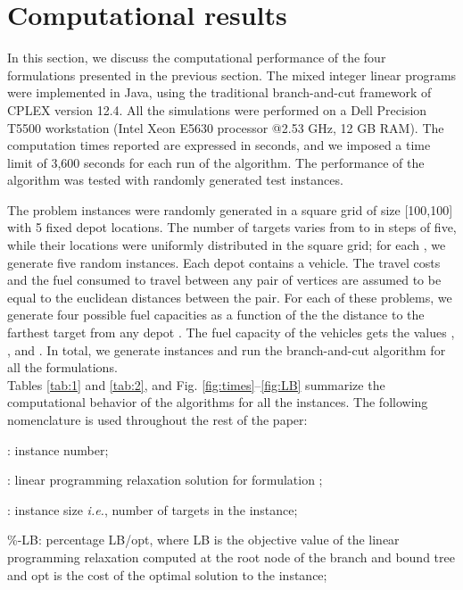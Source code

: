 \documentclass[letterpaper, 10pt, conference]{ieeeconf}
\begin{document}
\section{Computational results} \label{sec:results}
In this section, we discuss the computational performance of the four formulations presented in the previous section. The mixed integer linear programs were implemented in Java, using the traditional branch-and-cut framework of CPLEX version 12.4. All the simulations were performed on a Dell Precision T5500 workstation (Intel Xeon E5630 processor @2.53 GHz, 12 GB RAM). The computation times reported are expressed in seconds, and we imposed a time limit of 3,600 seconds for each run of the algorithm. The performance of the algorithm was tested with randomly generated test instances. \\


The problem instances were randomly generated in a square grid of size [100,100] with 5 fixed depot locations. The number of targets varies from  to  in steps of five, while their locations were uniformly distributed in the square grid; for each , we generate five random instances. Each depot contains a vehicle. The travel costs and the fuel consumed to travel between any pair of vertices are assumed to be equal to the euclidean distances between the pair. For each of these problems, we generate four possible fuel capacities  as a function of the the distance to the farthest target from any depot . The fuel capacity  of the vehicles gets the values , ,  and . In total, we generate  instances and run the branch-and-cut algorithm for all the formulations.  \\

Tables \ref{tab:1} and \ref{tab:2}, and Fig. \ref{fig:times}--\ref{fig:LB} summarize the computational behavior of the algorithms for all the  instances. The following nomenclature is used throughout the rest of the paper:\medskip{}

\noindent : instance number;

\noindent : linear programming relaxation solution for formulation ;

\noindent : instance size \emph{i.e.}, number of targets in the instance;

\noindent \%-LB: percentage LB/opt, where LB is the objective value of the linear programming relaxation computed at the root node of the branch and bound tree and opt is the cost of the optimal solution to the instance;
\end{document}
